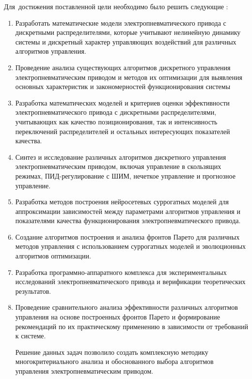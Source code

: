 Для~достижения поставленной цели необходимо было решить следующие {\tasks}:
\begin{enumerate}[beginpenalty=10000] %
\item Разработать математические модели электропневматического привода с дискретными распределителями,
которые учитывают нелинейную динамику системы и дискретный характер управляющих воздействий для различных алгоритмов управления.

\item Проведение анализа существующих алгоритмов дискретного управления электропневматическим приводом и
методов их оптимизации для выявления основных характеристик и закономерностей функционирования системы

\item Разработка математических моделей и критериев оценки эффективности электропневматического привода с дискретными
распределителями, учитывающих как качество позиционирования, так и интенсивность переключений распределителей 
и остальных интересующих показателей качества.

\item Синтез и исследование различных алгоритмов дискретного управления электропневматическим приводом,
включая управление в скользящих режимах, ПИД-регулирование с ШИМ, нечеткое управление и прогнозное управление.

\item Разработка методов построения нейросетевых суррогатных моделей для аппроксимации зависимостей между
параметрами алгоритмов управления и показателями качества функционирования электропневматического привода.

\item Создание алгоритмов построения и анализа фронтов Парето для различных методов
управления с использованием суррогатных моделей и эволюционных алгоритмов оптимизации.

\item Разработка программно-аппаратного комплекса для
экспериментальных исследований электропневматического привода и верификации теоретических результатов.

\item Проведение сравнительного анализа эффективности различных алгоритмов управления на основе построенных фронтов Парето и
формирование рекомендаций по их практическому применению в зависимости от требований к системе.

Решение данных задач позволило создать комплексную методику многокритериального анализа и
обоснованного выбора алгоритмов управления электропневматическим приводом.
\end{enumerate}


